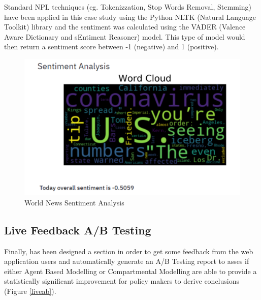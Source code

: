 Standard NPL techniques (eg. Tokenizzation, Stop Words Removal, Stemming) have been applied in this case study using the Python NLTK (Natural Language Toolkit) library and the sentiment was calculated using the VADER (Valence Aware Dictionary and sEntiment Reasoner) model. This type of model would then return a sentiment score between -1 (negative) and 1 (positive).

\begin{figure}[ht!]%
    \centering
    \includegraphics[width=0.8\linewidth]{latex/images/news2.pdf}
    \caption{World News Sentiment Analysis}
    \label{news2}
\end{figure}

\subsection{Live Feedback A/B Testing}
Finally, has been designed a section in order to get some feedback from the web application users and automatically generate an A/B Testing report to asses if either Agent Based Modelling or Compartmental Modelling are able to provide a statistically significant improvement for policy makers to derive conclusions (Figure \ref{liveab}).  

